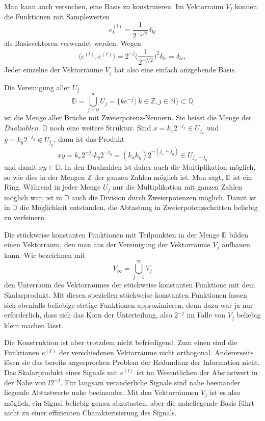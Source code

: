 Man kann auch versuchen, eine Basis zu konstruieren.
Im Vektorraum $V_j$ können die Funktionen mit Samplewerten
\[
e^{(l)}_k = \frac{1}{2^{-j/2}}\delta_{kl}
\]
als Basisvektoren verwendet werden.
Wegen
\[
\langle e^{(l)},e^{(r)}\rangle
=
2^{-j}
\biggl(
\frac{1}{2^{-j/2}}
\biggr)^2\delta_{lr}
=
\delta_{lr},
\]
Jeder einzelne der Vektorräume $V_j$ hat also eine einfach anzgebende
Basis.

Die Vereinigung aller $U_j$ 
\[
\mathbb D
=
\bigcup_{j=0}^\infty U_j
=
\{ ke^{-j}\,|\, k\in\mathbb Z, j\in\mathbb N\}
\subset
\mathbb Q
\]
ist die Menge aller Brüche mit Zweierpotenz-Nennern.
Sie heisst die Menge der {\em Dualzahlen}.
$\mathbb D$ noch eine weitere Struktur. %
Sind $x = k_x2^{-j_x}\in U_{j_x}$ und $y=k_y2^{-j_y}\in U_{j_y}$, dann
ist das Produkt
\[
xy = k_x2^{-j_x} k_y2^{-j_y}=(k_xk_y)2^{-(j_x+j_y)}\in U_{j_x+j_y}
\]
und damit $xy\in\mathbb D$.
In den Dualzahlen ist daher auch die Multiplikation möglich, so wie
dies in der Mengen $\mathbb Z$ der ganzen Zahlen möglich ist.
Man sagt, $\mathbb D$ ist ein Ring.
Während in jeder Menge $U_j$ nur die Multiplikation mit ganzen Zahlen
möglich war, ist in $\mathbb D$ auch die Division durch Zweierpotenzen
möglich.
Damit ist in $\mathbb D$ die Möglichkeit entstanden, die Abtastung
in Zweierpotenzschritten beliebig zu verfeinern.

Die stückweise konstanten Funktionen mit Teilpunkten in der Menge
$\mathbb D$ bilden einen Vektorraum, den man aus der Vereinigung
der Vektorräume $V_j$ aufbauen kann.
Wir bezeichnen mit
\[
V_\infty = \bigcup_{j=1}^\infty V_j 
\]
den Unterraum des Vektorraumes der stückweise konstanten Funktione mit
dem Skalarprodukt.
Mit diesen speziellen stückweise konstanten Funktionen lassen sich ebenfalls
beliebige stetige Funktionen approximieren, denn dazu war ja nur 
erforderlich, dass sich das Korn der Unterteilung, also $2^{-j}$ im Falle
von $V_j$ beliebig klein machen lässt.

Die Konstruktion ist aber trotzdem nicht befriedigend.
Zum einen sind die Funktionen $e^{(k)}$ der verschiedenen Vektorräume
nicht orthogonal.
Andererseits lösen sie das bereits angesprochen Problem der Redundanz
der Information nicht.
Das Skalarprodukt eines Signals mit $e^{(l)}$ ist im Wesentlichen der
Abstastwert in der Nähe von $l2^{-j}$.
Für langsam veränderliche Signale sind nahe beeinander liegende 
Abtastwerte nahe beeinander.
Mit den Vektorräumen $V_j$ ist es also möglich, ein Signal beliebig
genau abzutasten, aber die naheliegende Basis führt nicht zu einer
effizienten Charakterisierung des Signals.


